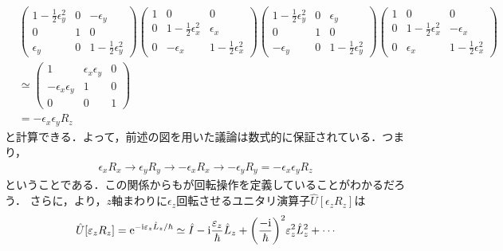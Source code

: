 \documentclass{report}
\begin{document}
  \begin{align}
    &\begin{pmatrix}
      1 - \frac{1}{2}\epsilon_y^2 & 0 & -\epsilon_y\\
      0 & 1 & 0\\
      \epsilon_y & 0 & 1 - \frac{1}{2}\epsilon_y^2
    \end{pmatrix}
    \begin{pmatrix}
      1 & 0 & 0\\
      0 & 1 - \frac{1}{2}\epsilon_x^2 & \epsilon_x\\
      0 & -\epsilon_x & 1 - \frac{1}{2}\epsilon_x^2
    \end{pmatrix}
    \begin{pmatrix}
      1 - \frac{1}{2}\epsilon_y^2 & 0 & \epsilon_y\\
      0 & 1 & 0\\
      -\epsilon_y & 0 & 1 - \frac{1}{2}\epsilon_y^2
    \end{pmatrix}
    \begin{pmatrix}
      1 & 0 & 0\\
      0 & 1 - \frac{1}{2}\epsilon_x^2 & -\epsilon_x\\
      0 & \epsilon_x & 1 - \frac{1}{2}\epsilon_x^2
    \end{pmatrix}\\
    &\simeq
    \begin{pmatrix}
      1 & \epsilon_x\epsilon_y & 0\\
      -\epsilon_x\epsilon_y & 1 & 0\\
      0 & 0 & 1
    \end{pmatrix}\\
    &= - \epsilon_x\epsilon_y R_z
  \end{align}
  と計算できる．よって，前述の図を用いた議論は数式的に保証されている．つまり，
  \begin{align}
    \epsilon_xR_x \to \epsilon_y R_y \to -\epsilon_x R_x \to -\epsilon_yR_y = -\epsilon_x\epsilon_y R_z
  \end{align}
  ということである．この関係からもが回転操作を定義していることがわかるだろう．
  さらに，より，$z$軸まわりに$\epsilon_z$回転させるユニタリ演算子$\hat{U}[\epsilon_zR_z]$は
  \begin{align}
    \hat{U}[\varepsilon_zR_z] = \mathrm{e}^{-\mathrm{i}\varepsilon_z\hat{L}_z/\hbar} \simeq \hat{I} - \mathrm{i}\frac{\varepsilon_z}{\hbar}\hat{L}_z + \qty(\frac{-\mathrm{i}}{\hbar})^2\varepsilon_z^2 \hat{L}_z^2 + \cdots
  \end{align}
\end{document}
